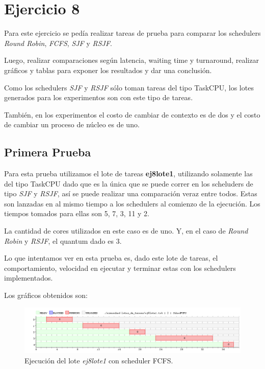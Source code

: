 \section{Ejercicio 8}

Para este ejercicio se pedía realizar tareas de prueba para comparar los schedulers \emph{Round Robin}, \emph{FCFS}, \emph{SJF} y \emph{RSJF}.

Luego, realizar comparaciones según latencia, waiting time y turnaround, realizar gráficos y tablas para exponer los resultados y dar una conclusión.

Como los schedulers \emph{SJF} y \emph{RSJF} sólo toman tareas del tipo TaskCPU, los lotes generados para los experimentos son con este tipo de tareas.

También, en los experimentos el costo de cambiar de contexto es de dos y el costo de cambiar un proceso de núcleo es de uno.

\subsection{Primera Prueba}

Para esta prueba utilizamos el lote de tareas \textbf{ej8lote1}, utilizando solamente las del tipo TaskCPU dado que es la única que se puede correr en los scheluders de tipo \emph{SJF} y \emph{RSJF}, así se puede realizar una comparación veraz entre todos. Estas son lanzadas en al mismo tiempo a los schedulers al comienzo de la ejecución. Los tiempos tomados para ellas son 5, 7, 3, 11 y 2.

La cantidad de cores utilizados en este caso es de uno. Y, en el caso de \emph{Round Robin} y \emph{RSJF}, el quantum dado es 3.

Lo que intentamos ver en esta prueba es, dado este lote de tareas, el comportamiento, velocidad en ejecutar y terminar estas con los schedulers implementados.

Los gráficos obtenidos son:

\begin{figure}[!h]
	\begin{center}
		\includegraphics[width=500px]{imagenes/ej8_prueba1_fcfs.png}
		\caption{Ejecución del lote \emph{ej8lote1} con scheduler FCFS.}
		\label{fig:grafico_ej8_prueba1_fcfs}
	\end{center}
\end{figure}


